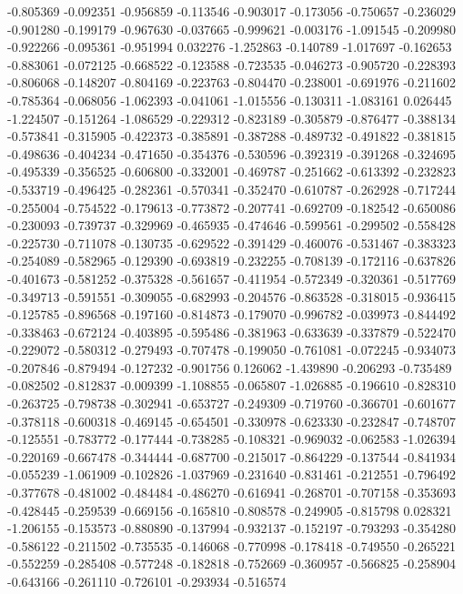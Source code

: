-0.805369
-0.092351
-0.956859
-0.113546
-0.903017
-0.173056
-0.750657
-0.236029
-0.901280
-0.199179
-0.967630
-0.037665
-0.999621
-0.003176
-1.091545
-0.209980
-0.922266
-0.095361
-0.951994
0.032276
-1.252863
-0.140789
-1.017697
-0.162653
-0.883061
-0.072125
-0.668522
-0.123588
-0.723535
-0.046273
-0.905720
-0.228393
-0.806068
-0.148207
-0.804169
-0.223763
-0.804470
-0.238001
-0.691976
-0.211602
-0.785364
-0.068056
-1.062393
-0.041061
-1.015556
-0.130311
-1.083161
0.026445
-1.224507
-0.151264
-1.086529
-0.229312
-0.823189
-0.305879
-0.876477
-0.388134
-0.573841
-0.315905
-0.422373
-0.385891
-0.387288
-0.489732
-0.491822
-0.381815
-0.498636
-0.404234
-0.471650
-0.354376
-0.530596
-0.392319
-0.391268
-0.324695
-0.495339
-0.356525
-0.606800
-0.332001
-0.469787
-0.251662
-0.613392
-0.232823
-0.533719
-0.496425
-0.282361
-0.570341
-0.352470
-0.610787
-0.262928
-0.717244
-0.255004
-0.754522
-0.179613
-0.773872
-0.207741
-0.692709
-0.182542
-0.650086
-0.230093
-0.739737
-0.329969
-0.465935
-0.474646
-0.599561
-0.299502
-0.558428
-0.225730
-0.711078
-0.130735
-0.629522
-0.391429
-0.460076
-0.531467
-0.383323
-0.254089
-0.582965
-0.129390
-0.693819
-0.232255
-0.708139
-0.172116
-0.637826
-0.401673
-0.581252
-0.375328
-0.561657
-0.411954
-0.572349
-0.320361
-0.517769
-0.349713
-0.591551
-0.309055
-0.682993
-0.204576
-0.863528
-0.318015
-0.936415
-0.125785
-0.896568
-0.197160
-0.814873
-0.179070
-0.996782
-0.039973
-0.844492
-0.338463
-0.672124
-0.403895
-0.595486
-0.381963
-0.633639
-0.337879
-0.522470
-0.229072
-0.580312
-0.279493
-0.707478
-0.199050
-0.761081
-0.072245
-0.934073
-0.207846
-0.879494
-0.127232
-0.901756
0.126062
-1.439890
-0.206293
-0.735489
-0.082502
-0.812837
-0.009399
-1.108855
-0.065807
-1.026885
-0.196610
-0.828310
-0.263725
-0.798738
-0.302941
-0.653727
-0.249309
-0.719760
-0.366701
-0.601677
-0.378118
-0.600318
-0.469145
-0.654501
-0.330978
-0.623330
-0.232847
-0.748707
-0.125551
-0.783772
-0.177444
-0.738285
-0.108321
-0.969032
-0.062583
-1.026394
-0.220169
-0.667478
-0.344444
-0.687700
-0.215017
-0.864229
-0.137544
-0.841934
-0.055239
-1.061909
-0.102826
-1.037969
-0.231640
-0.831461
-0.212551
-0.796492
-0.377678
-0.481002
-0.484484
-0.486270
-0.616941
-0.268701
-0.707158
-0.353693
-0.428445
-0.259539
-0.669156
-0.165810
-0.808578
-0.249905
-0.815798
0.028321
-1.206155
-0.153573
-0.880890
-0.137994
-0.932137
-0.152197
-0.793293
-0.354280
-0.586122
-0.211502
-0.735535
-0.146068
-0.770998
-0.178418
-0.749550
-0.265221
-0.552259
-0.285408
-0.577248
-0.182818
-0.752669
-0.360957
-0.566825
-0.258904
-0.643166
-0.261110
-0.726101
-0.293934
-0.516574
